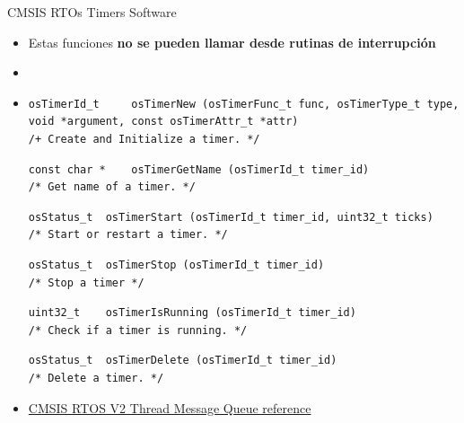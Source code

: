\begin{frame}[fragile]{CMSIS RTOs Timers Software}
    \begin{itemize}
        \item Estas funciones \textbf{no se pueden llamar desde rutinas de interrupción}
        \item[]
        \item[] 
         \begin{verbatim}
osTimerId_t 	osTimerNew (osTimerFunc_t func, osTimerType_t type, void *argument, const osTimerAttr_t *attr)
/+ Create and Initialize a timer. */
         \end{verbatim}
         \begin{verbatim}
const char * 	osTimerGetName (osTimerId_t timer_id)
/* Get name of a timer. */
         \end{verbatim}
         \begin{verbatim}
osStatus_t 	osTimerStart (osTimerId_t timer_id, uint32_t ticks)
/* Start or restart a timer. */
         \end{verbatim}
         \begin{verbatim}
osStatus_t 	osTimerStop (osTimerId_t timer_id)
/* Stop a timer */
         \end{verbatim}   
         \begin{verbatim}
uint32_t 	osTimerIsRunning (osTimerId_t timer_id)
/* Check if a timer is running. */
         \end{verbatim}            
         \begin{verbatim}
osStatus_t 	osTimerDelete (osTimerId_t timer_id)
/* Delete a timer. */
         \end{verbatim}
                 
         \item[] \href{https://arm-software.github.io/CMSIS_5/RTOS2/html/group__CMSIS__RTOS__TimerMgmt.html}{CMSIS RTOS V2 Thread Message Queue reference}
    \end{itemize}     
\end{frame}
